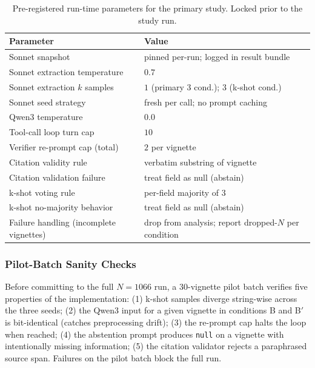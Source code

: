 \begin{table}[!htbp]
  \centering
  \caption{Pre-registered run-time parameters for the primary study.
  Locked prior to the study run.}
  \label{tab:prereg_params}
  \begin{tabular}{ll}
    \toprule
    Parameter & Value \\
    \midrule
    Sonnet snapshot                  & pinned per-run; logged in result bundle \\
    Sonnet extraction temperature    & $0.7$ \\
    Sonnet extraction $k$ samples    & $1$ (primary 3 cond.); $3$ (k-shot cond.) \\
    Sonnet seed strategy             & fresh per call; no prompt caching \\
    Qwen3 temperature                & $0.0$ \\
    Tool-call loop turn cap          & $10$ \\
    Verifier re-prompt cap (total)   & $2$ per vignette \\
    Citation validity rule           & verbatim substring of vignette \\
    Citation validation failure      & treat field as null (abstain) \\
    k-shot voting rule               & per-field majority of 3 \\
    k-shot no-majority behavior      & treat field as null (abstain) \\
    Failure handling (incomplete vignettes) & drop from analysis; report dropped-$N$ per condition \\
    \bottomrule
  \end{tabular}
\end{table}

\subsubsection{Pilot-Batch Sanity Checks}

Before committing to the full $N=1066$ run, a 30-vignette pilot batch
verifies five properties of the implementation:
(1) k-shot samples diverge string-wise across the three seeds;
(2) the Qwen3 input for a given vignette in conditions B and B$'$ is
bit-identical (catches preprocessing drift);
(3) the re-prompt cap halts the loop when reached;
(4) the abstention prompt produces \texttt{null} on a vignette with
intentionally missing information;
(5) the citation validator rejects a paraphrased source span.
Failures on the pilot batch block the full run.

